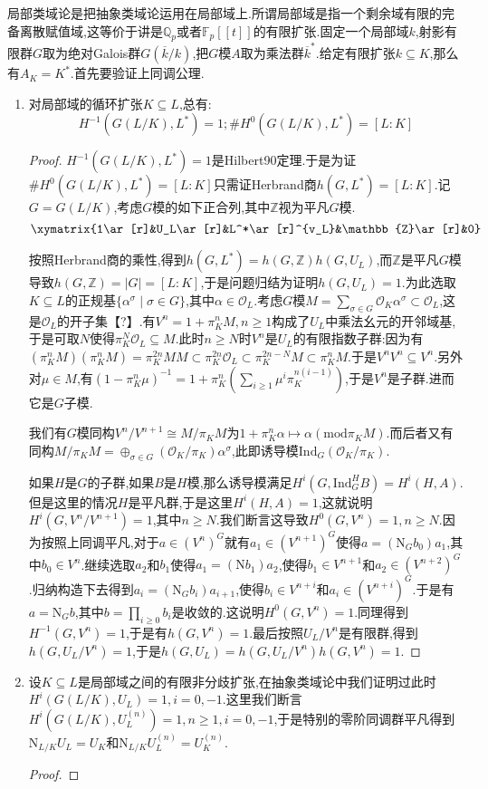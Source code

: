 局部类域论是把抽象类域论运用在局部域上.所谓局部域是指一个剩余域有限的完备离散赋值域,这等价于讲是$\mathbb{Q}_p$或者$\mathbb{F}_p[[t]]$的有限扩张.固定一个局部域$k$,射影有限群$G$取为绝对Galois群$G(\overline{k}/k)$,把$G$模$A$取为乘法群$\overline{k}^*$.给定有限扩张$k\subseteq K$,那么有$A_K=K^*$.首先要验证上同调公理.
\begin{enumerate}
	\item 对局部域的循环扩张$K\subseteq L$,总有:
	$$H^{-1}(G(L/K),L^*)=1;\#H^0(G(L/K),L^*)=[L:K]$$
	\begin{proof}
		
		$H^{-1}(G(L/K),L^*)=1$是Hilbert90定理.于是为证$\#H^0(G(L/K),L^*)=[L:K]$只需证Herbrand商$h(G,L^*)=[L:K]$.记$G=G(L/K)$,考虑$G$模的如下正合列,其中$\mathbb{Z}$视为平凡$G$模.
		$$\xymatrix{1\ar[r]&U_L\ar[r]&L^*\ar[r]^{v_L}&\mathbb{Z}\ar[r]&0}$$
		
		按照Herbrand商的乘性,得到$h(G,L^*)=h(G,\mathbb{Z})h(G,U_L)$,而$\mathbb{Z}$是平凡$G$模导致$h(G,\mathbb{Z})=|G|=[L:K]$,于是问题归结为证明$h(G,U_L)=1$.为此选取$K\subseteq L$的正规基$\{\alpha^{\sigma}\mid\sigma\in G\}$,其中$\alpha\in\mathscr{O}_L$.考虑$G$模$M=\sum_{\sigma\in G}\mathscr{O}_K\alpha^{\sigma}\subset\mathscr{O}_L$,这是$\mathscr{O}_L$的开子集【?】.有$V^n=1+\pi_K^nM,n\ge1$构成了$U_L$中乘法幺元的开邻域基,于是可取$N$使得$\pi_K^N\mathscr{O}_L\subseteq M$.此时$n\ge N$时$V^n$是$U_L$的有限指数子群:因为有$(\pi_K^nM)(\pi_K^nM)=\pi_K^{2n}MM\subset\pi_K^{2n}\mathscr{O}_L\subset\pi_K^{2n-N}M\subset\pi_K^nM$.于是$V^nV^n\subseteq V^n$.另外对$\mu\in M$,有$(1-\pi_K^n\mu)^{-1}=1+\pi_K^n(\sum_{i\ge1}\mu^i\pi_K^{n(i-1)})$,于是$V^n$是子群.进而它是$G$子模.
		
		我们有$G$模同构$V^n/V^{n+1}\cong M/\pi_KM$为$1+\pi_K^n\alpha\mapsto\alpha(\mathrm{mod}\pi_KM)$.而后者又有同构$M/\pi_KM=\oplus_{\sigma\in G}(\mathscr{O}_K/\pi_K)\alpha^{\sigma}$,此即诱导模$\mathrm{Ind}_G(\mathscr{O}_K/\pi_K)$.
		
		如果$H$是$G$的子群,如果$B$是$H$模,那么诱导模满足$H^i(G,\mathrm{Ind}_G^HB)=H^i(H,A)$.但是这里的情况$H$是平凡群,于是这里$H^i(H,A)=1$,这就说明$H^i(G,V^n/V^{n+1})=1$,其中$n\ge N$.我们断言这导致$H^0(G,V^n)=1,n\ge N$.因为按照上同调平凡,对于$a\in(V^n)^G$就有$a_1\in(V^{n+1})^G$使得$a=(\mathrm{N}_Gb_0)a_1$,其中$b_0\in V^n$.继续选取$a_2$和$b_1$使得$a_1=(\mathrm{N}b_1)a_2$,使得$b_1\in V^{n+1}$和$a_2\in(V^{n+2})^G$.归纳构造下去得到$a_i=(\mathrm{N}_Gb_i)a_{i+1}$,使得$b_i\in V^{n+i}$和$a_i\in(V^{n+i})^G$.于是有$a=\mathrm{N}_Gb$,其中$b=\prod_{i\ge0}b_i$是收敛的.这说明$H^0(G,V^n)=1$.同理得到$H^{-1}(G,V^n)=1$,于是有$h(G,V^n)=1$.最后按照$U_L/V^n$是有限群,得到$h(G,U_L/V^n)=1$,于是$h(G,U_L)=h(G,U_L/V^n)h(G,V^n)=1$.
	\end{proof}
    \item 设$K\subseteq L$是局部域之间的有限非分歧扩张,在抽象类域论中我们证明过此时$H^i(G(L/K),U_L)=1,i=0,-1$.这里我们断言$H^i(G(L/K),U_L^{(n)})=1,n\ge1,i=0,-1$,于是特别的零阶同调群平凡得到$\mathrm{N}_{L/K}U_L=U_K$和$\mathrm{N}_{L/K}U_L^{(n)}=U_K^{(n)}$.
    \begin{proof}
    	

\end{proof}
\end{enumerate}
